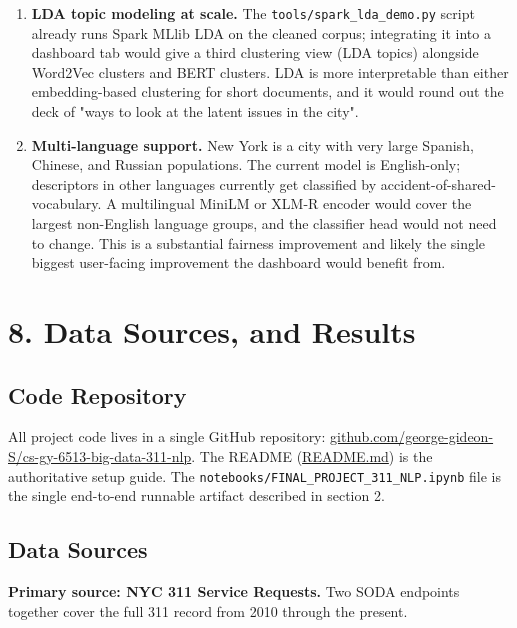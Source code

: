 \documentclass[11pt,letterpaper]{article}
\begin{document}
\begin{enumerate}
  \item \textbf{LDA topic modeling at scale.} The \texttt{tools/spark\_lda\_demo.py} script already runs Spark MLlib LDA on the cleaned corpus; integrating it into a dashboard tab would give a third clustering view (LDA topics) alongside Word2Vec clusters and BERT clusters. LDA is more interpretable than either embedding-based clustering for short documents, and it would round out the deck of "ways to look at the latent issues in the city".
  \item \textbf{Multi-language support.} New York is a city with very large Spanish, Chinese, and Russian populations. The current model is English-only; descriptors in other languages currently get classified by accident-of-shared-vocabulary. A multilingual MiniLM or XLM-R encoder would cover the largest non-English language groups, and the classifier head would not need to change. This is a substantial fairness improvement and likely the single biggest user-facing improvement the dashboard would benefit from.
\end{enumerate}

\newpage
\section{8. Data Sources, and Results}

\subsection{Code Repository}

All project code lives in a single GitHub repository: \href{https://github.com/george-gideon-S/cs-gy-6513-big-data-311-nlp}{github.com/george-gideon-S/cs-gy-6513-big-data-311-nlp}. The README (\href{https://github.com/george-gideon-S/cs-gy-6513-big-data-311-nlp/blob/main/README.md}{README.md}) is the authoritative setup guide. The \texttt{notebooks/FINAL\_PROJECT\_311\_NLP.ipynb} file is the single end-to-end runnable artifact described in section 2.

\subsection{Data Sources}

\textbf{Primary source: NYC 311 Service Requests.} Two SODA endpoints together cover the full 311 record from 2010 through the present.
\end{document}
